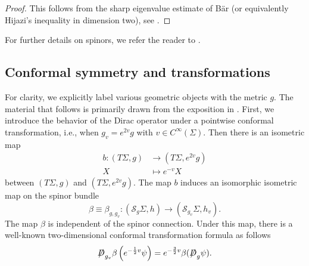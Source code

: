 \documentclass[a4paper, 12pt]{article}
\def\slashiii#1{\setbox0=\hbox{$#1$}#1\hskip-\wd0\hbox to\wd0{\hss\sl/\/\hss}}
\begin{document}
\begin{proof}
	This follows from the sharp eigenvalue estimate of B\"ar
	(or equivalently Hijazi's inequality in dimension two), see \cite{MR1162671,MR834486}.
\end{proof}

For further details on spinors, we refer the reader to \cite{MR1343997, MR0358873, jost2008riemannian}.
\subsection{Conformal symmetry and transformations}
For clarity, we explicitly label various geometric objects with the metric \(g\). The material that follows is primarily drawn from the exposition in \cite[Section 2]{MR4239839}. First, we introduce the behavior of the Dirac operator under a pointwise conformal transformation, i.e., when \(g_v = e^{2v}g\) with \(v\in C^{\infty}(\Sigma)\). Then there is an isometric map
\[
\begin{split}
	b : (T\Sigma,g) &\to (T\Sigma,e^{2v}g) \\
	X &\mapsto e^{-v}X
\end{split}
\]
between \((T\Sigma,g)\) and \((T\Sigma,e^{2v}g)\). The map \(b\) induces an isomorphic isometric map on the spinor bundle
\[
\beta\equiv\beta_{g,g_v} : (\mathcal{S}_g\Sigma,h)\to(\mathcal{S}_{g_v}\Sigma,h_v).
\]
The map \(\beta\) is independent of the spinor connection. Under this map, there is a well-known two-dimensional conformal transformation formula as follows
\[
\slashiii{D}_{g_v}\beta\left(e^{-\frac{1}{2}v}\psi\right)=e^{-\frac{3}{2}v}\beta(\slashiii{D}_g\psi).
\]
\end{document}
